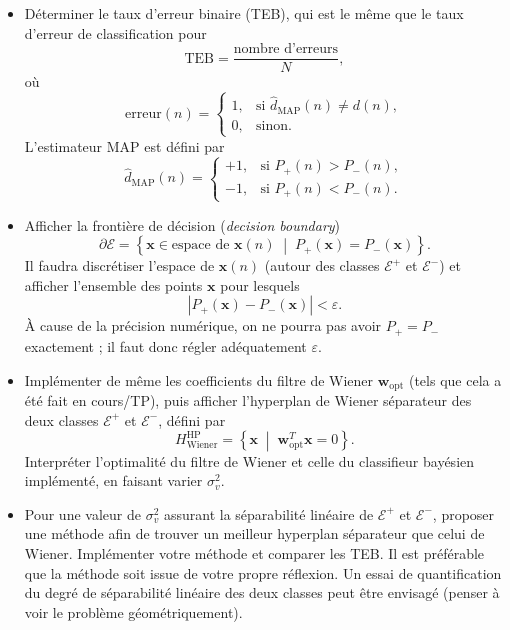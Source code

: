 \documentclass[11pt,a4paper]{article}
\newcommand{\xv}{\mathbf{x}}
\newcommand{\wv}{\mathbf{w}}
\begin{document}
\begin{enumerate}[label=\arabic*.]
\begin{itemize}
    \item Déterminer le taux d'erreur binaire (TEB), qui est le même que
    le taux d'erreur de classification pour
    \[
        \mathrm{TEB}=\frac{\text{nombre d'erreurs}}{N},
    \]
    où
    \[
        \mathrm{erreur}(n)=
        \begin{cases}
            1, & \text{si } \widehat d_{\mathrm{MAP}}(n)\neq d(n),\\
            0, & \text{sinon}.
        \end{cases}
    \]
    L'estimateur MAP est défini par
    \[
        \widehat d_{\mathrm{MAP}}(n)=
        \begin{cases}
            +1, & \text{si }P_{+}(n)>P_{-}(n),\\
            -1, & \text{si }P_{+}(n)<P_{-}(n).
        \end{cases}
    \]

    \item Afficher la frontière de décision (\textit{decision boundary})
    \[
        \partial\mathcal{E}
        =
        \left\{
        \xv\in\text{espace de }\xv(n)
        \;\middle|\;
        P_{+}(\xv)=P_{-}(\xv)
        \right\}.
    \]
    Il faudra discrétiser l'espace de $\xv(n)$ (autour des classes
    $\mathcal{E}^{+}$ et $\mathcal{E}^{-}$) et afficher l'ensemble des
    points $\xv$ pour lesquels
    \[
        \left|P_{+}(\xv)-P_{-}(\xv)\right|<\varepsilon.
    \]
    À cause de la précision numérique, on ne pourra pas avoir
    $P_{+}=P_{-}$ exactement ; il faut donc régler adéquatement
    $\varepsilon$.

    \item Implémenter de même les coefficients du filtre de Wiener
    $\wv_{\mathrm{opt}}$ (tels que cela a été fait en cours/TP), puis
    afficher l'hyperplan de Wiener séparateur des deux classes
    $\mathcal{E}^{+}$ et $\mathcal{E}^{-}$, défini par
    \[
        H_{\mathrm{Wiener}}^{\mathrm{HP}}
        =
        \left\{
        \xv\;\middle|\;
        \wv_{\mathrm{opt}}^{T}\xv=0
        \right\}.
    \]
    Interpréter l'optimalité du filtre de Wiener et celle du classifieur
    bayésien implémenté, en faisant varier $\sigma_v^2$.

    \item Pour une valeur de $\sigma_v^2$ assurant la séparabilité
    linéaire de $\mathcal{E}^{+}$ et $\mathcal{E}^{-}$, proposer une
    méthode afin de trouver un meilleur hyperplan séparateur que celui
    de Wiener. Implémenter votre méthode et comparer les TEB.
    Il est préférable que la méthode soit issue de votre propre réflexion.
    Un essai de quantification du degré de séparabilité linéaire des deux
    classes peut être envisagé (penser à voir le problème géométriquement).


\end{itemize}
\end{enumerate}
\end{document}
